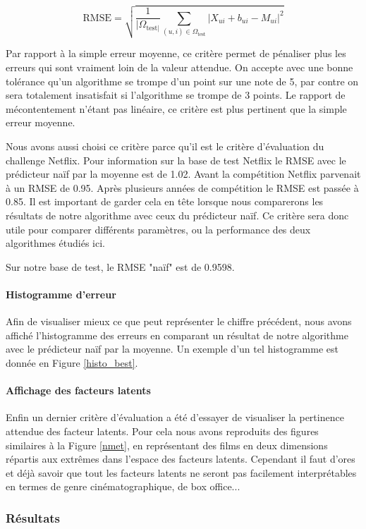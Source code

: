 \documentclass[10pt,a4paper]{article}
\begin{document}
$$ \text{RMSE} = \sqrt{\frac{1}{|\Omega_{\text{test}|}}\sum_{(u,i)\in \Omega_{\text{test}}} |X_{ui}+b_{ui}-M_{ui}|^2} $$

Par rapport à la simple erreur moyenne, ce critère permet de pénaliser plus les erreurs qui sont vraiment loin de la  valeur attendue. On accepte avec une bonne tolérance qu'un algorithme se trompe d'un point sur une note de 5, par contre on sera totalement insatisfait si l'algorithme se trompe de 3 points. Le rapport de mécontentement n'étant pas linéaire, ce critère est plus pertinent que la simple erreur moyenne.


Nous avons aussi choisi ce critère parce qu'il est le critère d'évaluation du challenge Netflix. Pour information sur la base de test Netflix le RMSE avec le prédicteur naïf par la moyenne est de 1.02. Avant la compétition Netflix parvenait à un RMSE de 0.95. Après plusieurs années de compétition le RMSE est passée à 0.85. Il est important de garder cela en tête lorsque nous comparerons les résultats de notre algorithme avec ceux du prédicteur naïf. Ce critère sera donc utile pour comparer différents paramètres, ou la performance des deux algorithmes étudiés ici. 

 Sur notre base de test, le RMSE "naïf" est de 0.9598.

\paragraph{Histogramme d'erreur} Afin de visualiser mieux ce que peut représenter le chiffre précédent, nous avons affiché l'histogramme des erreurs en comparant un résultat de notre algorithme avec le prédicteur naïf par la moyenne. Un exemple d'un tel histogramme est donnée en Figure \ref{histo_best}.

\paragraph{Affichage des facteurs latents}

Enfin un dernier critère d'évaluation a été d'essayer de visualiser la pertinence attendue des facteur latents. Pour cela nous avons reproduits des figures similaires à la Figure \ref{nmet}, en représentant des films en deux dimensions répartis aux extrêmes dans l'espace des facteurs latents. Cependant il faut d'ores et déjà savoir que tout les facteurs latents ne seront pas facilement interprétables en termes de genre cinématographique, de box office...

\subsubsection*{Résultats}
\end{document}
